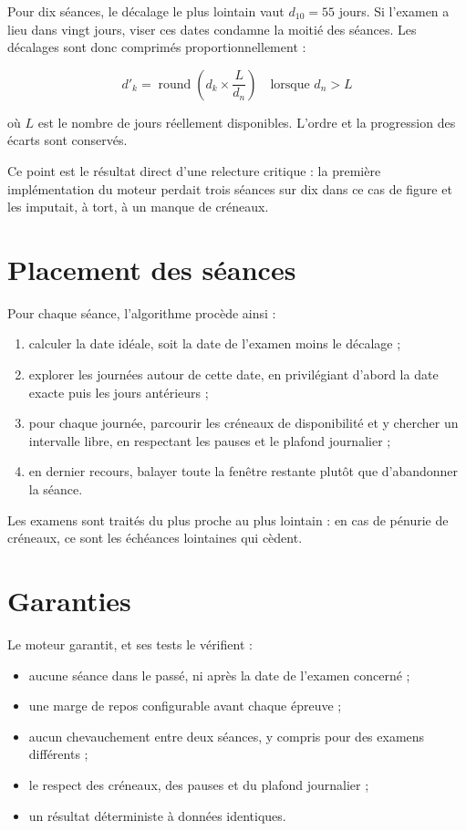 \documentclass[11pt,a4paper]{report}
\begin{document}
Pour dix séances, le décalage le plus lointain vaut $d_{10} = 55$ jours. Si
l'examen a lieu dans vingt jours, viser ces dates condamne la moitié des séances.
Les décalages sont donc comprimés proportionnellement :

\begin{equation}
  d'_k = \operatorname{round}\left(d_k \times \frac{L}{d_n}\right)
  \quad \text{lorsque } d_n > L
\end{equation}

où $L$ est le nombre de jours réellement disponibles. L'ordre et la progression
des écarts sont conservés.

Ce point est le résultat direct d'une relecture critique : la première
implémentation du moteur perdait trois séances sur dix dans ce cas de figure et
les imputait, à tort, à un manque de créneaux.

\section{Placement des séances}

Pour chaque séance, l'algorithme procède ainsi :

\begin{enumerate}[nosep,leftmargin=0.8cm]
  \item calculer la date idéale, soit la date de l'examen moins le décalage ;
  \item explorer les journées autour de cette date, en privilégiant d'abord la
        date exacte puis les jours antérieurs ;
  \item pour chaque journée, parcourir les créneaux de disponibilité et y chercher
        un intervalle libre, en respectant les pauses et le plafond journalier ;
  \item en dernier recours, balayer toute la fenêtre restante plutôt que
        d'abandonner la séance.
\end{enumerate}

Les examens sont traités du plus proche au plus lointain : en cas de pénurie de
créneaux, ce sont les échéances lointaines qui cèdent.

\section{Garanties}

Le moteur garantit, et ses tests le vérifient :

\begin{itemize}[nosep]
  \item aucune séance dans le passé, ni après la date de l'examen concerné ;
  \item une marge de repos configurable avant chaque épreuve ;
  \item aucun chevauchement entre deux séances, y compris pour des examens
        différents ;
  \item le respect des créneaux, des pauses et du plafond journalier ;
  \item un résultat déterministe à données identiques.
\end{itemize}
\end{document}
